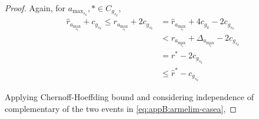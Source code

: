\begin{proof}
  Again, for $a_{\max_{s_{k}}}, * \in C_{g_{s_{k}}}$, 
  \begin{align*}
  \hat{r}_{a_{\max_{s_{k}}}} + c_{g_{s_{k}}}\leq r_{a_{\max_{s_{k}}}} + 2c_{g_{s_{k}}} &= \hat{r}_{a_{\max_{s_{k}}}} + 4c_{g_{k}} - 2c_{g_{s_{k}}}\\
  &< r_{a_{\max_{s_{k}}}} + \Delta_{a_{\max_{s_{k}}}} - 2c_{g_{s_{k}}}\\
  &= r^{*} -2c_{g_{s_{k}}}\\
  &\leq \hat{r}^{*} - c_{g_{s_{k}}}
  \end{align*}
   

% 

	Applying Chernoff-Hoeffding bound and considering independence of complementary of the two events in \ref{eq:appB:armelim-casea},
 

\end{proof}
